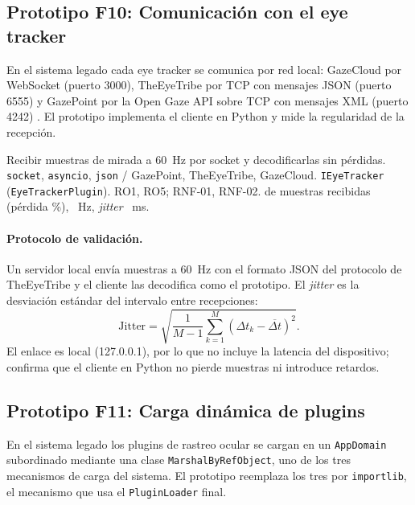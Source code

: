 \subsection{Prototipo F10: Comunicación con el eye tracker}

En el sistema legado cada eye tracker se comunica por red local: GazeCloud por WebSocket (puerto 3000), TheEyeTribe por TCP con mensajes JSON (puerto 6555) y GazePoint por la Open Gaze API sobre TCP con mensajes XML (puerto 4242) \citep{estay2020}. El prototipo implementa el cliente en Python y mide la regularidad de la recepción.

{Recibir muestras de mirada a 60~Hz por socket y decodificarlas sin pérdidas.}
{\texttt{socket}, \texttt{asyncio}, \texttt{json} / GazePoint, TheEyeTribe, GazeCloud.}
{\texttt{IEyeTracker} (\texttt{EyeTrackerPlugin}).}
{RO1, RO5; RNF-01, RNF-02.}
{ \FDiezRecibidas{} de \FDiezMuestras{} muestras recibidas (pérdida \FDiezPerdidaPct\%), \FDiezFrecuenciaHz~Hz, \textit{jitter} \FDiezJitterMs~ms.\newline {}}

\paragraph{Protocolo de validación.} Un servidor local envía \FDiezMuestras{} muestras a 60~Hz con el formato JSON del protocolo de TheEyeTribe y el cliente las decodifica como el prototipo. El \textit{jitter} es la desviación estándar del intervalo entre recepciones:
\begin{equation}
\mathrm{Jitter}=\sqrt{\frac{1}{M-1}\sum_{k=1}^{M}\left(\Delta t_k-\overline{\Delta t}\right)^2}.
\end{equation}
El enlace es local (127.0.0.1), por lo que no incluye la latencia del dispositivo; confirma que el cliente en Python no pierde muestras ni introduce retardos.

\subsection{Prototipo F11: Carga dinámica de plugins}

En el sistema legado los plugins de rastreo ocular se cargan en un \texttt{AppDomain} subordinado mediante una clase \texttt{MarshalByRefObject}, uno de los tres mecanismos de carga del sistema. El prototipo reemplaza los tres por \texttt{importlib}, el mecanismo que usa el \texttt{PluginLoader} final.

